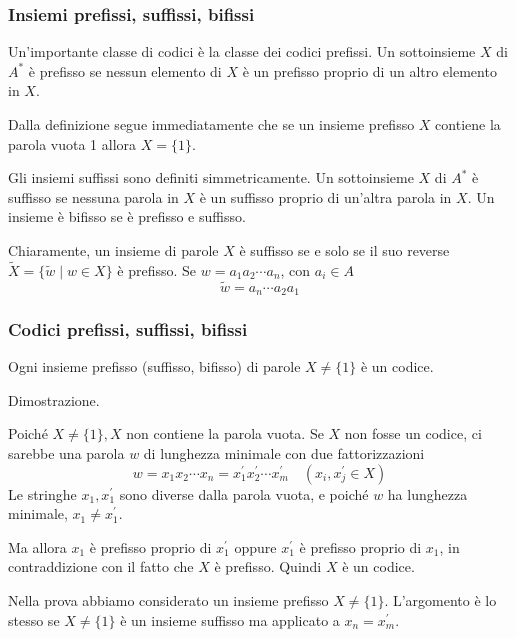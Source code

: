 \subsubsection{Insiemi prefissi, suffissi, bifissi}

Un'importante classe di codici è la classe dei codici prefissi.
Un sottoinsieme $X$ di $A^{*}$ è prefisso se nessun elemento di $X$ è un prefisso proprio di un altro elemento in $X$.

Dalla definizione segue immediatamente che se un insieme prefisso $X$ contiene la parola vuota 1 allora $X=\{1\}$.

\vspace{5mm}

Gli insiemi suffissi sono definiti simmetricamente.
Un sottoinsieme $X$ di $A^{*}$ è suffisso se nessuna parola in $X$ è un suffisso proprio di un'altra parola in $X$.
Un insieme è bifisso se è prefisso e suffisso.

Chiaramente, un insieme di parole $X$ è suffisso se e solo se il suo reverse $\widetilde{X}=\{\tilde{w} \mid w \in X\}$ è prefisso.
Se $w=a_{1} a_{2} \cdots a_{n}$, con $a_{i} \in A$
$$
\tilde{w}=a_{n} \cdots a_{2} a_{1}
$$

\subsubsection{Codici prefissi, suffissi, bifissi}
Ogni insieme prefisso (suffisso, bifisso) di parole $X \neq\{1\}$ è un codice.


\vspace{5mm}

Dimostrazione.

Poiché $X \neq\{1\}, X$ non contiene la parola vuota.
Se $X$ non fosse un codice, ci sarebbe una parola $w$ di lunghezza minimale con due fattorizzazioni
$$
w=x_{1} x_{2} \cdots x_{n}=x_{1}^{\prime} x_{2}^{\prime} \cdots x_{m}^{\prime} \quad\left(x_{i}, x_{j}^{\prime} \in X\right)
$$
Le stringhe $x_{1}, x_{1}^{\prime}$ sono diverse dalla parola vuota, e poiché $w$ ha lunghezza minimale, $x_{1} \neq x_{1}^{\prime}$.

Ma allora $x_{1}$ è prefisso proprio di $x_{1}^{\prime}$ oppure $x_{1}^{\prime}$ è prefisso proprio di $x_{1}$, in contraddizione con il fatto che $X$ è prefisso. Quindi $X$ è un codice.

Nella prova abbiamo considerato un insieme prefisso $X \neq\{1\}$.
L'argomento è lo stesso se $X \neq\{1\}$ è un insieme suffisso ma applicato a $ x_{n}=x_{m}^{\prime}$.

